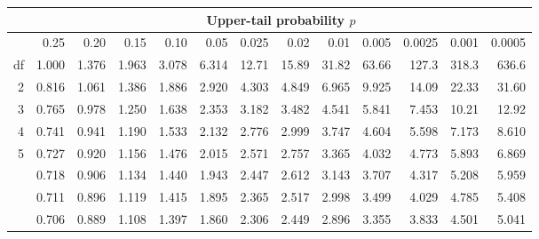 \begin{center}
\small{
\hspace*{-1cm}
\begin{tabular}{r | rrr rr rrrr rrr}
\hline
	&	\multicolumn{12}{c}{Upper-tail probability $p$}	\\
\hline
	& 0.25 &   0.20  &   0.15  &   0.10  &   0.05  &   0.025 &   0.02 & 0.01  &   0.005 &  0.0025 & 0.001 &   0.0005 \\
\hline
df \quad 1	&	1.000	&	1.376	&	1.963	&	3.078	&	6.314	&	12.71	&	15.89	&	31.82	&	63.66	&	127.3	&	318.3	&	636.6	\\
 2	&	0.816	&	1.061	&	1.386	&	1.886	&	2.920	&	4.303	&	4.849	&	6.965	&	9.925	&	14.09	&	22.33	&	31.60	\\
3	&	0.765	&	0.978	&	1.250	&	1.638	&	2.353	&	3.182	&	3.482	&	4.541	&	5.841	&	7.453	&	10.21	&	12.92	\\
 4	&	0.741	&	0.941	&	1.190	&	1.533	&	2.132	&	2.776	&	2.999	&	3.747	&	4.604	&	5.598	&	7.173	&	8.610	\\
5	&	0.727	&	0.920	&	1.156	&	1.476	&	2.015	&	2.571	&	2.757	&	3.365	&	4.032	&	4.773	&	5.893	&	6.869	\\
\gray 6	&	0.718	&	0.906	&	1.134	&	1.440	&	1.943	&	2.447	&	2.612	&	3.143	&	3.707	&	4.317	&	5.208	&	5.959	\\
\gray7	&	0.711	&	0.896	&	1.119	&	1.415	&	1.895	&	2.365	&	2.517	&	2.998	&	3.499	&	4.029	&	4.785	&	5.408	\\
\gray 8	&	0.706	&	0.889	&	1.108	&	1.397	&	1.860	&	2.306	&	2.449	&	2.896	&	3.355	&	3.833	&	4.501	&	5.041	\\

\end{tabular}}
\end{center}
